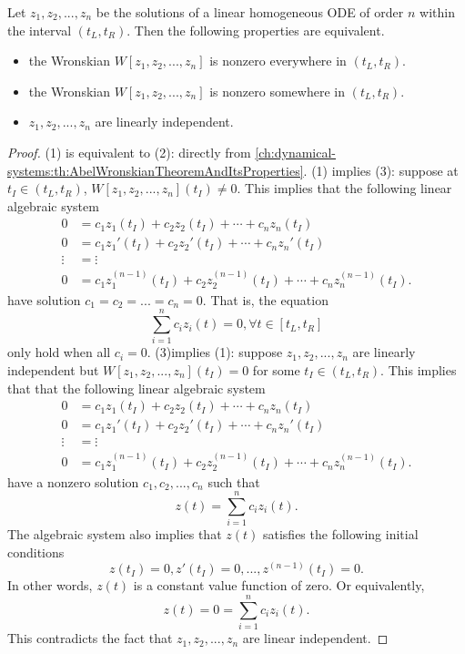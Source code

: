 \begin{refsection}
\begin{theorem}\label{ch:dynamical-systems:th:LinearIndependenceAndNonzeroWronskianForlinearHomogeneousODE}Let $z_1,z_2,...,z_n$ be the solutions of a linear homogeneous ODE of order $n$ within the interval $(t_L,t_R)$. Then the following properties are equivalent.
\begin{itemize}
	\item the Wronskian $W[z_1,z_2,...,z_n]$ is nonzero everywhere in $(t_L,t_R)$.
	\item the Wronskian $W[z_1,z_2,...,z_n]$ is nonzero somewhere in $(t_L,t_R)$.
	\item $z_1,z_2,...,z_n$ are linearly independent.
\end{itemize}	
\end{theorem}
\begin{proof}
(1) is equivalent to (2): directly from \autoref{ch:dynamical-systems:th:AbelWronskianTheoremAndItsProperties}. (1) implies (3): suppose at $t_I\in (t_L,t_R)$,  $W[z_1,z_2,...,z_n](t_I)\neq 0$. This implies that the following linear algebraic system
 	\begin{align*}
 0 &= c_1z_1(t_I) + c_2z_2(t_I) + \cdots + c_nz_n(t_I) \\
 0 &= c_1z_1'(t_I) + c_2z_2'(t_I) + \cdots + c_nz_n'(t_I) \\
 \vdots &= \vdots\\
 0 &= c_1z_1^{(n-1)}(t_I) + c_2z_2^{(n-1)}(t_I) + \cdots + c_nz_n^{(n-1)}(t_I). 
 \end{align*}
have solution $c_1=c_2=...=c_n= 0$.  That is, the equation
$$\sum_{i=1}^n c_i z_i(t) = 0, \forall t\in[t_L,t_R]$$
only hold when all $c_i = 0$.
(3)implies (1): suppose $z_1,z_2,...,z_n$ are linearly independent but $W[z_1,z_2,...,z_n](t_I) = 0$ for some $t_I\in (t_L,t_R)$.
This implies that
that the following linear algebraic system
\begin{align*}
0 &= c_1z_1(t_I) + c_2z_2(t_I) + \cdots + c_nz_n(t_I) \\
0 &= c_1z_1'(t_I) + c_2z_2'(t_I) + \cdots + c_nz_n'(t_I) \\
\vdots &= \vdots\\
0 &= c_1z_1^{(n-1)}(t_I) + c_2z_2^{(n-1)}(t_I) + \cdots + c_nz_n^{(n-1)}(t_I). 
\end{align*}
have a nonzero solution $c_1,c_2,...,c_n$ such that
$$z(t) = \sum_{i=1}^n c_i z_i(t).$$
The algebraic system also implies that $z(t)$ satisfies the following initial conditions
$$z(t_I) = 0,z'(t_I) = 0,...,z^{(n-1)}(t_I) = 0.$$
In other words, $z(t)$ is a constant value function of zero. Or equivalently,
$$z(t) = 0 = \sum_{i=1}^n c_i z_i(t).$$
This contradicts the fact that $z_1,z_2,...,z_n$ are linear independent.
\end{proof}


\end{refsection}
